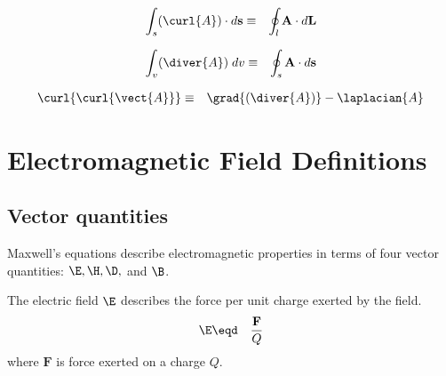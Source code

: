 \begin{identity}
\label{id_stokes}
\begin{eqnarray*}
   \int_s (\curl{A}) \cdot d\mathbf{s} &\equiv& \oint_l {\mathbf A} \cdot d{\mathbf L}
\end{eqnarray*}
\end{identity}

\begin{identity}
\label{id_divergence}
\begin{eqnarray*}
   \int_v (\diver{A}) \; dv &\equiv& \oint_s {\mathbf A} \cdot d{\mathbf s}
\end{eqnarray*}
\end{identity}

\begin{identity}
\label{id_laplace}
\begin{eqnarray*}
   \curl{\curl{\vect{A}}} &\equiv& \grad{(\diver{A})} - \laplacian{A}
\end{eqnarray*}
\end{identity}






\section{Electromagnetic Field Definitions}
\subsection{Vector quantities}
Maxwell's equations describe electromagnetic properties in terms of four
vector quantities: $\E, \H, \D,$ and $\B$.

\begin{definition}
\label{def_e}
The electric field $\E$ describes the force per unit charge exerted by the field.
\begin{eqnarray*}
   \E &\eqd& \frac{\mathbf F}{Q}
\end{eqnarray*}
where ${\mathbf F}$ is force exerted on a charge $Q$.
\end{definition}

